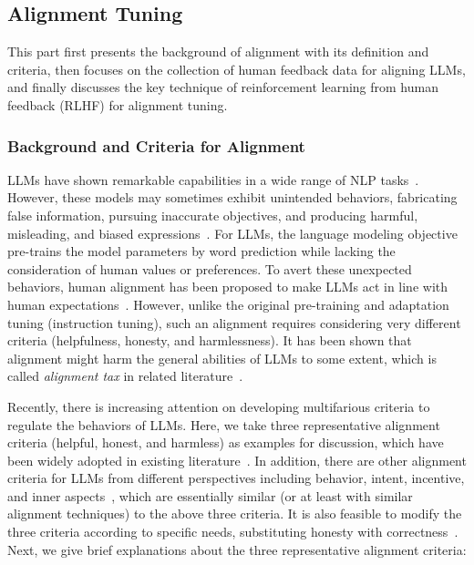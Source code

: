 \subsection{Alignment Tuning}
\label{sec-alignment}

This part first presents the background of alignment with its definition and criteria, then focuses on the collection of human feedback data for aligning LLMs, and finally discusses the key technique of reinforcement learning from human feedback (RLHF) for alignment tuning. 

\subsubsection{Background and Criteria for Alignment}
\label{sec-alignment-background}
 LLMs have shown remarkable capabilities in a wide range of NLP tasks~\cite{Brown-NeurIPS-2020-Language,Chowdhery-arxiv-2022-PaLM,Wei-ICLR-2022-Finetuned,Zhang-arxiv-2022-OPT}. However, these models may sometimes exhibit  unintended behaviors, \eg  fabricating false information, pursuing inaccurate objectives, and producing harmful, misleading, and biased expressions~\cite{Ouyang-arxiv-2022-Training,Kenton-arxiv-2021-Alignment}. For LLMs, the language modeling objective pre-trains the model parameters by word prediction while lacking the consideration of human values or preferences.    
{To avert these unexpected behaviors, human alignment has been proposed to make LLMs act in line with human expectations}~\cite{Ouyang-arxiv-2022-Training,Ziegler-arxiv-2019-Fine-Tuning}.  
However, unlike the original pre-training  and adaptation tuning (\eg instruction tuning), such an alignment requires considering very different criteria  (\eg helpfulness, honesty, and harmlessness).  It has been shown that alignment might harm the general abilities of LLMs to some extent, which is called \emph{alignment tax} in related literature~\cite{Askell-arxiv-2021-A}.  
 
{Recently, there is increasing attention on developing multifarious criteria to regulate the behaviors of LLMs. 
Here, we take three representative alignment criteria (\ie helpful, honest, and harmless) as examples for discussion, which have been widely adopted  in existing literature~\cite{Askell-arxiv-2021-A,Ouyang-arxiv-2022-Training}. 
}
In addition, there are  other alignment criteria for LLMs from different  perspectives including behavior, intent, incentive, and inner aspects~\cite{Kenton-arxiv-2021-Alignment}, which are essentially similar (or at least with similar  alignment techniques) to the above three criteria. 
It is also feasible to modify the three criteria according to specific needs, \eg substituting honesty with correctness~\cite{Glaese-arxiv-2022-Improving}.   
Next, we give brief explanations about the three representative alignment criteria:

